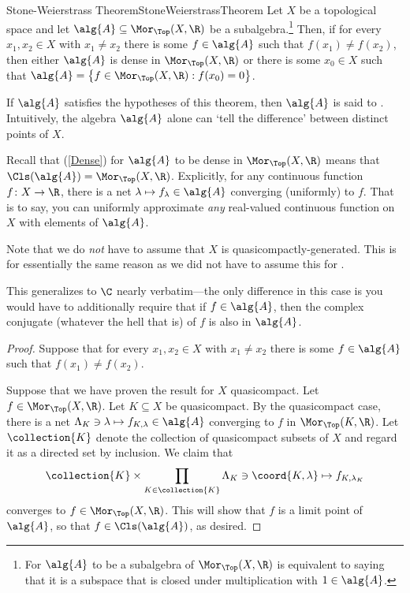\begin{thm}{Stone-Weierstrass Theorem}{StoneWeierstrassTheorem}
Let $X$ be a topological space and let $\alg{A}\subseteq \Mor _{\Top}(X,\R )$ be a subalgebra.\footnote{For $\alg{A}$ to be a subalgebra of $\Mor _{\Top}(X,\R )$ is equivalent to saying that it is a subspace that is closed under multiplication with $1\in \alg{A}$.}  Then, if for every $x_1,x_2\in X$ with $x_1\neq x_2$ there is some $f\in \alg{A}$ such that $f(x_1)\neq f(x_2)$, then either $\alg{A}$ is dense in $\Mor _{\Top}(X,\R )$ or there is some $x_0\in X$ such that $\alg{A}=\left\{ f\in \Mor _{\Top}(X,\R ):f(x_0)=0\right\}$.
\begin{rmk}
If $\alg{A}$ satisfies the hypotheses of this theorem, then $\alg{A}$ is said to .  Intuitively, the algebra $\alg{A}$ alone can `tell the difference' between distinct points of $X$.
\end{rmk}
\begin{rmk}
Recall that (\cref{Dense}) for $\alg{A}$ to be dense in $\Mor _{\Top}(X,\R )$ means that $\Cls (\alg{A})=\Mor _{\Top}(X,\R )$.  Explicitly, for any continuous function $f\colon X\rightarrow \R$, there is a net $\lambda \mapsto f_{\lambda}\in \alg{A}$ converging (uniformly) to $f$.  That is to say, you can uniformly approximate \emph{any} real-valued continuous function on $X$ with elements of $\alg{A}$.
\end{rmk}
\begin{rmk}
Note that we do \emph{not} have to assume that $X$ is quasicompactly-generated.  This is for essentially the same reason as we did not have to assume this for .
\end{rmk}
\begin{rmk}
This generalizes to $\C$ nearly verbatim---the only difference in this case is you would have to additionally require that if $f\in \alg{A}$, then the complex conjugate (whatever the hell that is) of $f$ is also in $\alg{A}$.
\end{rmk}
\begin{proof}
Suppose that for every $x_1,x_2\in X$ with $x_1\neq x_2$ there is some $f\in \alg{A}$ such that $f(x_1)\neq f(x_2)$.

Suppose that we have proven the result for $X$ quasicompact.  Let $f\in \Mor _{\Top}(X,\R )$.  Let $K\subseteq X$ be quasicompact.  By the quasicompact case, there is a net $\Lambda _K\ni \lambda \mapsto f_{K,\lambda}\in \alg{A}$ converging to $f$ in $\Mor _{\Top}(K,\R )$.  Let $\collection{K}$ denote the collection of quasicompact subsets of $X$ and regard it as a directed set by inclusion.  We claim that
\begin{equation}
\collection{K}\times \prod _{K\in \collection{K}}\Lambda _K\ni \coord{K,\lambda}\mapsto f_{K,\lambda _K}
\end{equation}
converges to $f\in \Mor _{\Top}(X,\R )$.  This will show that $f$ is a limit point of $\alg{A}$, so that $f\in \Cls (\alg{A})$, as desired.


\end{proof}
\end{thm}
